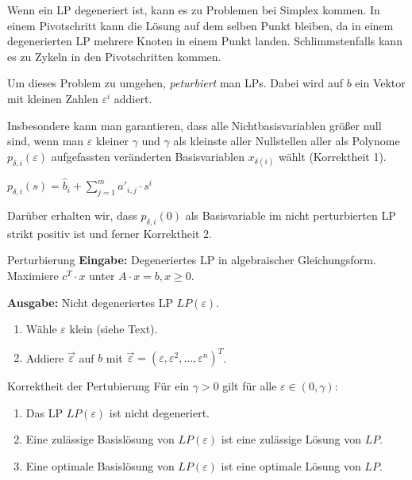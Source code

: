 \documentclass{panikzettel}
\begin{document}
\begin{halfboxl}
Wenn ein LP degeneriert ist, kann es zu Problemen bei Simplex kommen.
In einem Pivotschritt kann die Lösung auf dem selben Punkt bleiben, da in einem degenerierten LP mehrere Knoten in einem Punkt landen.
Schlimmstenfalls kann es zu Zykeln in den Pivotschritten kommen.

Um dieses Problem zu umgehen, \emph{peturbiert} man LPs.
Dabei wird auf $b$ ein Vektor mit kleinen Zahlen $\varepsilon^i$ addiert.

Insbesondere kann man garantieren, dass alle Nichtbasisvariablen größer null sind, wenn man $\varepsilon$ kleiner $\gamma$ und $\gamma$ als kleinste aller Nullstellen aller als Polynome $p_{\delta, i}(\varepsilon)$ aufgefassten veränderten Basisvariablen $x_{\delta(i)}$ wählt (Korrektheit 1).

\begin{tightcenter}
$p_{\delta,i}(s) = \hat{b}_i + \sum_{j=1}^m a'_{i,j} \cdot s^i$
\end{tightcenter}

Darüber erhalten wir, dass $p_{\delta, i}(0)$ als Basisvariable im nicht perturbierten LP strikt positiv ist und ferner Korrektheit 2.
\end{halfboxl}%
\begin{halfboxr}
\vspace{-\baselineskip}
\begin{algo}{Perturbierung}
\textbf{Eingabe:} Degeneriertes LP in algebraischer Gleichungsform. \\
\-\hspace{1em} Maximiere $c^T \cdot x$ unter $A \cdot x = b, x \geq 0$.

\textbf{Ausgabe:} Nicht degeneriertes LP $LP(\varepsilon)$.
\tcblower
\begin{enumerate}
    \item Wähle $\varepsilon$ klein (siehe Text).
    \item Addiere $\vec{\varepsilon}$ auf $b$ mit $\vec{\varepsilon} = (\varepsilon, \varepsilon^2, \dots, \varepsilon^n)^T$.
\end{enumerate}
\end{algo}

\begin{theo}{Korrektheit der Pertubierung}
Für ein $\gamma > 0$ gilt für alle $\varepsilon \in (0,\gamma)$:
\begin{enumerate}
    \item Das LP $LP(\varepsilon)$ ist nicht degeneriert.
    \item Eine zulässige Basislösung von $LP(\varepsilon)$ ist eine zulässige Lösung von $LP$.
    \item Eine optimale Basislösung von $LP(\varepsilon)$ ist eine optimale Lösung von $LP$.
\end{enumerate}
\end{theo}
\end{halfboxr}
\end{document}
